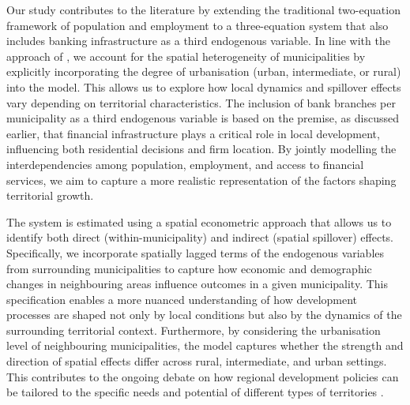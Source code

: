 \documentclass[a4paper,11pt,oneside]{article}
\begin{document}
Our study contributes to the literature by extending the traditional two-equation framework of population and employment to a three-equation system that also includes banking infrastructure as a third endogenous variable. In line with the approach of \cite{alama2025spatio}, we account for the spatial heterogeneity of municipalities by explicitly incorporating the degree of urbanisation (urban, intermediate, or rural) into the model. This allows us to explore how local dynamics and spillover effects vary depending on territorial characteristics. The inclusion of bank branches per municipality as a third endogenous variable is based on the premise, as discussed earlier, that financial infrastructure plays a critical role in local development, influencing both residential decisions and firm location. By jointly modelling the interdependencies among population, employment, and access to financial services, we aim to capture a more realistic representation of the factors shaping territorial growth.



The system is estimated using a spatial econometric approach that allows us to identify both direct (within-municipality) and indirect (spatial spillover) effects. Specifically, we incorporate spatially lagged terms of the endogenous variables from surrounding municipalities to capture how economic and demographic changes in neighbouring areas influence outcomes in a given municipality. This specification enables a more nuanced understanding of how development processes are shaped not only by local conditions but also by the dynamics of the surrounding territorial context. Furthermore, by considering the urbanisation level of neighbouring municipalities, the model captures whether the strength and direction of spatial effects differ across rural, intermediate, and urban settings. This contributes to the ongoing debate on how regional development policies can be tailored to the specific needs and potential of different types of territories \citep{fratesi2023regional}.







\end{document}
